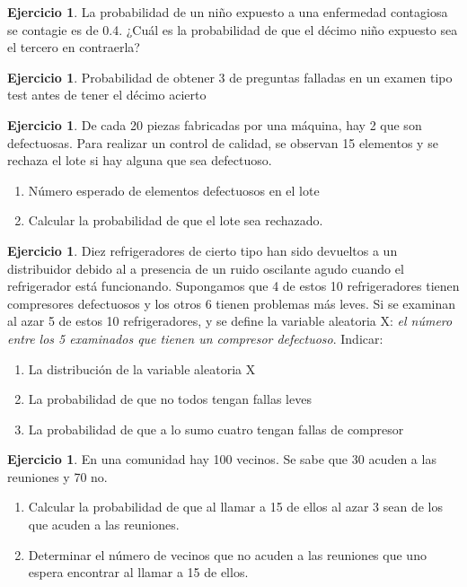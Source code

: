 \documentclass[]{article}
\providecommand{\tightlist}{%
  \setlength{\itemsep}{0pt}\setlength{\parskip}{0pt}}
\theoremstyle{plain}
\theoremstyle{definition}
\newtheorem{exercise}[theorem]{Ejercicio}
\theoremstyle{definition} %
\begin{document}
\begin{exercise}
  La probabilidad de un niño expuesto a una enfermedad contagiosa se
  contagie es de 0.4. ¿Cuál es la probabilidad de que el décimo niño
  expuesto sea el tercero en contraerla?
\end{exercise}

\begin{exercise}
  Probabilidad de obtener 3 de preguntas falladas en un examen tipo test
  antes de tener el décimo acierto 
\end{exercise}

\begin{exercise}
  De cada 20 piezas fabricadas por una máquina, hay 2 que son
  defectuosas. Para realizar un control de calidad, se observan 15
  elementos y se rechaza el lote si hay alguna que sea defectuoso. 
  
  \begin{enumerate}
    \item Número esperado de elementos defectuosos en el lote
    \item Calcular la probabilidad de que el lote sea rechazado.
  \end{enumerate}
  
\end{exercise}

\begin{exercise}
  Diez refrigeradores de cierto tipo han sido devueltos a un
  distribuidor debido al a presencia de un ruido oscilante agudo cuando
  el refrigerador está funcionando. Supongamos que 4 de estos 10
  refrigeradores tienen compresores defectuosos y los otros 6 tienen
  problemas más leves. Si se examinan al azar 5 de estos 10
  refrigeradores, y se define la variable aleatoria X: \emph{el
  número entre los 5 examinados que tienen un compresor defectuoso}.
  Indicar:
  \begin{enumerate}
  \def\labelenumii{\arabic{enumii}.}
  \tightlist
  \item
    La distribución de la variable aleatoria X
  \item
    La probabilidad de que no todos tengan fallas leves
  \item
    La probabilidad de que a lo sumo cuatro tengan fallas de compresor
  \end{enumerate}
\end{exercise}

\begin{exercise}
  En una comunidad hay 100 vecinos. Se sabe que 30 acuden a las
  reuniones y 70 no. 
  \begin{enumerate}
    \item Calcular la probabilidad de que al llamar a 15 de
    ellos al azar 3 sean de los que acuden a las reuniones.
    \item Determinar el número de vecinos que no acuden a las reuniones que uno espera encontrar 
    al llamar a 15 de ellos.
  \end{enumerate}

  
\end{exercise}
\end{document}
